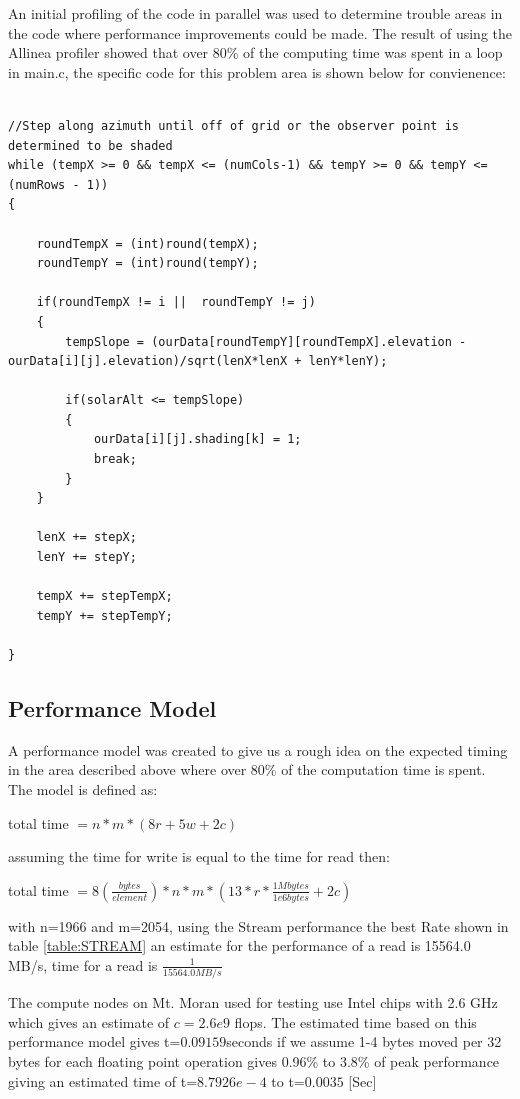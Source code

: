 \documentclass[]{article}%
\begin{document}
An initial profiling of the code in parallel was used to determine trouble areas in the code where performance improvements could be made. The result of using the Allinea profiler showed that over 80\% of the computing time was spent in a loop in main.c, the specific code for this problem area is shown below for convienence:
{\small
\begin{verbatim}

//Step along azimuth until off of grid or the observer point is determined to be shaded
while (tempX >= 0 && tempX <= (numCols-1) && tempY >= 0 && tempY <= (numRows - 1))
{	

	roundTempX = (int)round(tempX);
	roundTempY = (int)round(tempY);			

	if(roundTempX != i ||  roundTempY != j) 
	{
		tempSlope = (ourData[roundTempY][roundTempX].elevation - ourData[i][j].elevation)/sqrt(lenX*lenX + lenY*lenY);	

		if(solarAlt <= tempSlope)
		{	
			ourData[i][j].shading[k] = 1;
			break;
		}
	}												

	lenX += stepX;		
	lenY += stepY;

	tempX += stepTempX;
	tempY += stepTempY;

}
\end{verbatim}}


\subsection{Performance Model}

A performance model was created to give us a rough idea on the expected timing in the area described above where over 80\% of the computation time is spent. The model is defined as:

total time $=n*m*(8r+5w+2c)$

assuming the time for write is equal to the time for read then:

total time $=8 (\frac{bytes}{element})*n*m*(13*r*\frac{1Mbytes}{1e6 bytes} + 2c)$

with n=1966 and m=2054, using the Stream performance the best Rate shown in table \ref{table:STREAM} an estimate for the performance of a read is 15564.0 MB/s, time for a read is $\frac{1}{15564.0 MB/s}$


The compute nodes on Mt. Moran used for testing use Intel chips with 2.6 GHz which gives an estimate of $c=2.6e9$ flops. The estimated time based on this performance model gives t=$  0.09159 $seconds if we assume 1-4 bytes moved per 32 bytes for each floating point operation gives 0.96\% to 3.8\% of peak performance giving an estimated time  of t=$8.7926e-4$ to  t=$0.0035$ [Sec]
\end{document}
